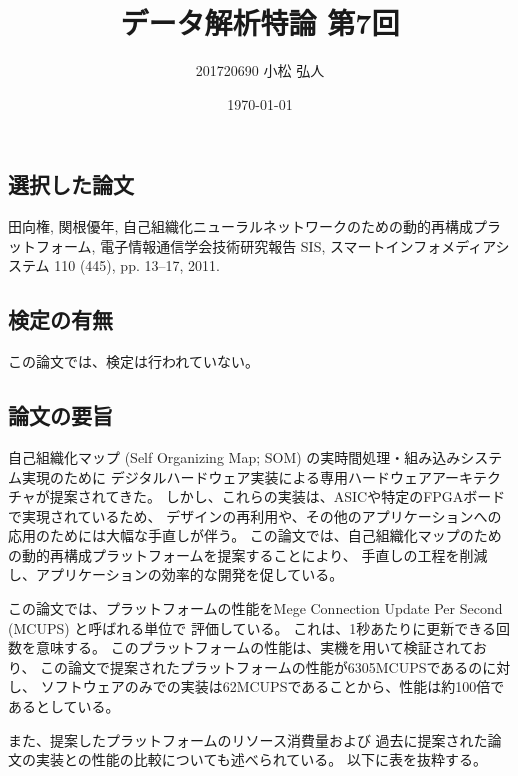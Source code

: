 \documentclass{jsarticle}
\title{データ解析特論 第7回}
\author{201720690 小松 弘人}
\date{\today}
\begin{document}
\maketitle
\thispagestyle{empty}
\subsection*{選択した論文}
田向権, 関根優年, 自己組織化ニューラルネットワークのための動的再構成プラットフォーム,
電子情報通信学会技術研究報告 SIS, スマートインフォメディアシステム 110 (445), pp. 13--17, 2011.

\subsection*{検定の有無}
この論文では、検定は行われていない。

\subsection*{論文の要旨}
自己組織化マップ (Self Organizing Map; SOM) の実時間処理・組み込みシステム実現のために
デジタルハードウェア実装による専用ハードウェアアーキテクチャが提案されてきた。
しかし、これらの実装は、ASICや特定のFPGAボードで実現されているため、
デザインの再利用や、その他のアプリケーションへの応用のためには大幅な手直しが伴う。
この論文では、自己組織化マップのための動的再構成プラットフォームを提案することにより、
手直しの工程を削減し、アプリケーションの効率的な開発を促している。

この論文では、プラットフォームの性能をMege Connection Update Per Second (MCUPS) と呼ばれる単位で
評価している。
これは、1秒あたりに更新できる回数を意味する。
このプラットフォームの性能は、実機を用いて検証されており、
この論文で提案されたプラットフォームの性能が6305MCUPSであるのに対し、
ソフトウェアのみでの実装は62MCUPSであることから、性能は約100倍であるとしている。

また、提案したプラットフォームのリソース消費量および
過去に提案された論文の実装との性能の比較についても述べられている。
以下に表を抜粋する。
\end{document}
